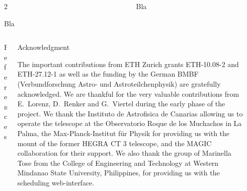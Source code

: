 \documentclass[t]{beamer}
\newlength{\thirdtextwidth}
\begin{document}
\begin{columns}[t, onlytextwidth]
  \begin{column}{2\thirdtextwidth}
    \begin{block}[equal height group=4]{Bla}
      \blindtext
      \blindtext
    \end{block}
  \end{column}
  \begin{column}{\thirdtextwidth}
    \begin{block}[equal height group=4]{Bla}
      \blindtext
    \end{block}
  \end{column}
\end{columns}



\vfill
\begin{columns}[t, onlytextwidth]%
  \begin{column}{0.42\textwidth}%
    \begin{block}[equal height group=bottom]{\normalsize References}
      \footnotesize%
      \printbibliography%
    \end{block}
  \end{column}%
  \begin{column}{0.42\textwidth}%
    \begin{block}[equal height group=bottom]{\normalsize Acknowledgment}
      \begin{multicols}{2}%
        \footnotesize
        The  important  contributions  from  ETH Zurich  grants  ETH-10.08-2  and  ETH-27.12-1  as  well  as  the funding by the German BMBF (Verbundforschung Astro- und Astroteilchenphysik) are gratefully acknowledged.
        We are thankful for the very valuable contributions from E.~Lorenz, D.~Renker and G.~Viertel during the early phase of the project.
        We thank the Instituto de Astrofisica de Canarias allowing us to operate the telescope at the Observatorio Roque de los Muchachos in La Palma, the Max-Planck-Institut für Physik for providing us with the mount of the former HEGRA CT 3 telescope, and the MAGIC collaboration for their support.
        We also thank the group of Marinella Tose from the College of Engineering and Technology at Western Mindanao State University, Philippines, for providing us with the scheduling web-interface.
      \end{multicols}%
    \end{block}
  \end{column}%
  \begin{column}{0.16\textwidth}%

\end{column}
\end{columns}
\end{document}
